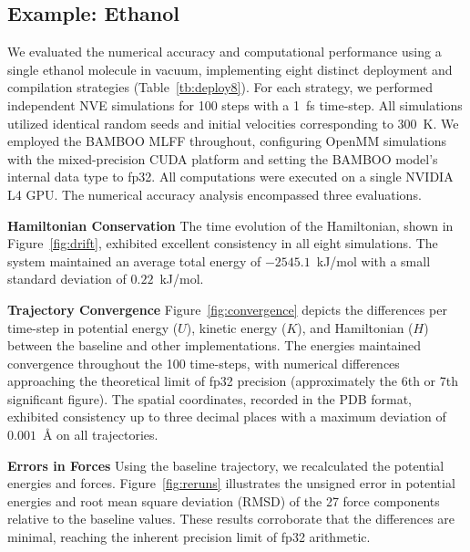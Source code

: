 \subsection{Example: Ethanol}

We evaluated the numerical accuracy and computational performance
using a single ethanol molecule in vacuum,
implementing eight distinct deployment
and compilation strategies (Table~\ref{tb:deploy8}).
For each strategy, we performed independent NVE simulations
for 100 steps with a 1~fs time-step.
All simulations utilized identical random seeds
and initial velocities corresponding to 300~K.
We employed the BAMBOO \cite{Gong2024} MLFF throughout,
configuring OpenMM simulations with the mixed-precision CUDA platform
and setting the BAMBOO model's internal data type to fp32.
All computations were executed on a single NVIDIA L4 GPU.
The numerical accuracy analysis encompassed three evaluations.

\ifdefined\InlineFloatEnv

\else\fi

\textbf{Hamiltonian Conservation}
The time evolution of the Hamiltonian,
shown in Figure~\ref{fig:drift}, exhibited excellent consistency
in all eight simulations.
The system maintained an average total energy of $-2545.1$~kJ/mol
with a small standard deviation of $0.22$~kJ/mol.

\ifdefined\InlineFloatEnv

\else\fi

\textbf{Trajectory Convergence}
Figure~\ref{fig:convergence} depicts the differences per time-step
in potential energy ($U$), kinetic energy ($K$), and Hamiltonian ($H$)
between the baseline and other implementations.
The energies maintained convergence throughout the 100 time-steps,
with numerical differences approaching the theoretical limit of fp32 precision
(approximately the 6th or 7th significant figure).
The spatial coordinates, recorded in the PDB format,
exhibited consistency up to three decimal places
with a maximum deviation of $0.001$~\AA{} on all trajectories.

\ifdefined\InlineFloatEnv

\else\fi

\textbf{Errors in Forces}
Using the baseline trajectory, we recalculated the potential energies and forces.
Figure~\ref{fig:reruns} illustrates the unsigned error in potential energies
and root mean square deviation (RMSD) of the 27 force components
relative to the baseline values.
These results corroborate that the differences are minimal,
reaching the inherent precision limit of fp32 arithmetic.

